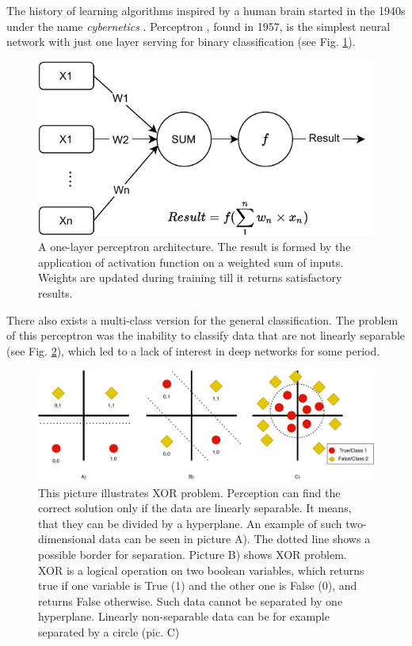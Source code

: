 \par

The history of learning algorithms inspired by a human brain started in the 1940s under the name \textit{cybernetics} \citep{Goodfellow-et-al-2016} \citep{McCulloch}.
Perceptron \citep{Rosenblatt1958}, found in 1957, is the simplest neural network with just one layer serving for binary classification (see Fig. \ref{pic:perceptron}).

\begin{figure}[ht]
\centering
\includegraphics[width=0.8\columnwidth]{../img/perceptron}
\caption{A one-layer perceptron architecture. The result is formed by the application of activation function on a weighted sum of inputs. Weights are updated during training till it returns satisfactory results. }
\label{pic:perceptron}
\end{figure}
There also exists a multi-class version for the general classification. The problem of this perceptron was the inability to classify data that are not linearly separable \citep{Minsky2017} (see Fig. \ref{pic:xor}), which led to a lack of interest in deep networks for some period.
\begin{figure}[ht]
\centering
\includegraphics[width=1\columnwidth]{../img/xor}
\caption{This picture illustrates XOR problem. Perception can find the correct solution only if the data are linearly separable. It means, that they can be divided by a hyperplane. An example of such two-dimensional data can be seen in picture A). The dotted line shows a possible border for separation. Picture B) shows XOR problem. XOR is a logical operation on two boolean variables, which returns true if one variable is True (1) and the other one is False (0), and returns False otherwise. Such data cannot be separated by one hyperplane. Linearly non-separable data can be for example separated by a circle (pic. C)}
\label{pic:xor}
\end{figure}
